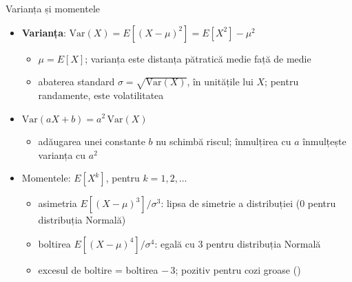 \begin{frame}{Varianța și momentele}
\itemsize{\small}
\begin{itemize}
    \item \textbf{Varianța}: $\text{Var}(X) = E[(X - \mu)^2] = E[X^2] - \mu^2$
    \begin{itemize}
        \item $\mu = E[X]$; varianța este distanța pătratică medie față de medie
        \item abaterea standard $\sigma = \sqrt{\text{Var}(X)}$, în unitățile lui $X$; pentru randamente, este volatilitatea
    \end{itemize}
    \item $\text{Var}(aX + b) = a^2\,\text{Var}(X)$
    \begin{itemize}
        \item adăugarea unei constante $b$ nu schimbă riscul; înmulțirea cu $a$ înmulțește varianța cu $a^2$
    \end{itemize}
    \item Momentele: $E[X^k]$, pentru $k = 1, 2, \dots$
    \begin{itemize}
        \item asimetria $E[(X - \mu)^3]/\sigma^3$: lipsa de simetrie a distribuției (0 pentru distribuția Normală)
        \item boltirea $E[(X - \mu)^4]/\sigma^4$: egală cu 3 pentru distribuția Normală
        \item excesul de boltire = boltirea $-\,3$; pozitiv pentru cozi groase ()
    \end{itemize}
\end{itemize}
\end{frame}

